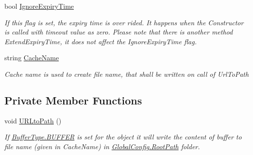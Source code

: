 \begin{DoxyCompactItemize}
bool \mbox{\hyperlink{class_concord_1_1_c3_http_module_1_1_http_response_buffer_aeb642c055b040fe5d7f04e58a1b82ee4}{Ignore\+Expiry\+Time}}
\begin{DoxyCompactList}\small\item\em If this flag is set, the expiry time is over rided. It happens when the Constructor is called with timeout value as zero. Please note that there is another method Extend\+Expiry\+Time, it does not affect the Ignore\+Expiry\+Time flag. \end{DoxyCompactList}\item 
string \mbox{\hyperlink{class_concord_1_1_c3_http_module_1_1_http_response_buffer_a15fcb356f7318119513be34b11b9f6d6}{Cache\+Name}}
\begin{DoxyCompactList}\small\item\em Cache name is used to create file name, that shall be written on call of Url\+To\+Path \end{DoxyCompactList}\end{DoxyCompactItemize}
\subsection*{Private Member Functions}
\begin{DoxyCompactItemize}
\item 
void \mbox{\hyperlink{class_concord_1_1_c3_http_module_1_1_http_response_buffer_afa05ddc467a347089e0e0f5d7dea8a4c}{U\+R\+Lto\+Path}} ()
\begin{DoxyCompactList}\small\item\em If \mbox{\hyperlink{class_concord_1_1_c3_http_module_1_1_http_response_buffer_a34a310395d4f4472b24cf6da3fc3ab82a17de626bcae5109bb2f7a66dfc4a8a1d}{Buffer\+Type.\+B\+U\+F\+F\+ER}} is set for the object it will write the content of buffer to file name (given in Cache\+Name) in \mbox{\hyperlink{class_concord_1_1_c3_http_module_1_1_global_config_a21a3589b22cff498ecd2828fdecf1213}{Global\+Config.\+Root\+Path}} folder. \end{DoxyCompactList}\end{DoxyCompactItemize}
